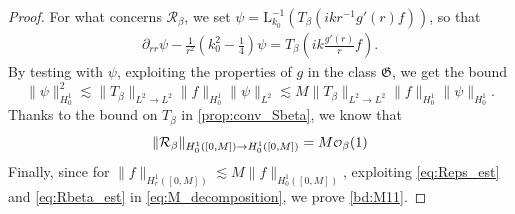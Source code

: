 \documentclass[11pt,reqno]{amsproc}
\newcommand{\red}[1]{\textcolor{red}{#1}}
\def\HH {\dot{H}^1}
\newcommand{\rmL}{\mathrm{L}}
\newcommand\smallO{
  \mathchoice
    {{\scriptstyle\mathcal{O}}}%
    {{\scriptstyle\mathcal{O}}}%
    {{\scriptscriptstyle\mathcal{O}}}%
    {\scalebox{.7}{$\scriptscriptstyle\mathcal{O}$}}%
  }
\theoremstyle{definition}
\theoremstyle{definition}
\numberwithin{equation}{section}
\begin{document}
\begin{proof}
For what concerns $\mathcal R_\beta$, we set $\psi = \rmL_{k_0}^{-1}\left( T_\beta \left(ik r^{-1} g'(r)f \right)\right)$, so that
\begin{align}
    \partial_{rr} \psi - \frac{1}{r^2} \left(k_0^2-\frac{1}{4}\right) \psi = T_\beta \left(ik \frac{g'(r)}{r}f\right).
\end{align}
By testing with $\psi$, exploiting the properties of $g$ in the class $\mathfrak{G}$, we get the bound
\begin{equation}
\| \psi \|^2_{H^1_0} \lesssim \|T_\beta\|_{L^2\rightarrow L^2} \|f\|_{H^1_0} \|\psi\|_{L^2}\lesssim M\|T_\beta\|_{L^2\rightarrow L^2} \|f\|_{H^1_0} \|\psi\|_{H^1_0}.
\end{equation}
Thanks to the bound on $T_\beta$ in \cref{prop:conv_Sbeta}, we know that
\begin{equation}
\label{eq:Rbeta_est}
 \|\mathcal R_\beta \|_{H^1_0([0,M])\to H^1_0([0,M])} =M\smallO_\beta(1)
\end{equation}
Finally, since for $\|f\|_{H^1_r([0,M])}\lesssim M\|f\|_{H^1_0([0,M])}$, exploiting \cref{eq:Reps_est} and \cref{eq:Rbeta_est} in \cref{eq:M_decomposition}, we prove \cref{bd:M11}.



\end{proof}
\end{document}
